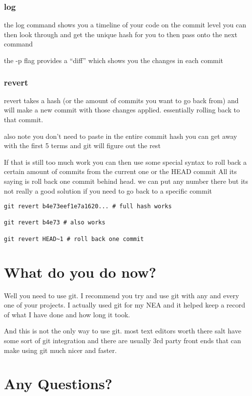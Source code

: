 \documentclass[a4paper]{article}
\begin{document}
\subsubsection*{log}
\label{sec:orgaff0ee5}
\begin{notes}
	the log command shows you a timeline of your code on the commit level you can
	then look through and get the unique hash for you to then pass onto the next
	command

	the -p flag provides a ``diff'' which shows you the changes in each commit
\end{notes}
\subsubsection*{revert}
\label{sec:org0c12900}
\begin{notes}
	revert takes a hash (or the amount of commits you want to go back from) and will
	make a new commit with those changes applied. essentially rolling back to that
	commit.

	also note you don't need to paste in the entire commit hash you can get away
	with the first 5 terms and git will figure out the rest

	If that is still too much work you can then use some special syntax to roll back
	a certain amount of commits from the current one or the HEAD commit
	All its saying is roll back one commit behind head. we can put any number there
	but its not really a good solution if you need to go back to a specific commit
\end{notes}

\begin{verbatim}
git revert b4e73eef1e7a1620... # full hash works

git revert b4e73 # also works

git revert HEAD~1 # roll back one commit
\end{verbatim}
\section*{What do you do now?}
\label{sec:org87c7100}
\begin{notes}
	Well you need to use git. I recommend you try and use git with any and every one
	of your projects. I actually used git for my NEA and it helped keep a record of
	what I have done and how long it took.

	And this is not the only way to use git. most text editors worth there salt have
	some sort of git integration and there are usually 3rd party front ends that can
	make using git much nicer and faster.
\end{notes}

\section*{Any Questions?}
\label{sec:org2835661}
\end{document}
